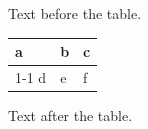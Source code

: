 \documentclass[12pt]{article}
\begin{document}
Text before the table.

\begin{tabular}{|l|l|l|}\hline a & b & c\\\cline{1-1}\cline{3-3} d & e & f\\\hline\end{tabular}

Text after the table.
\end{document}
